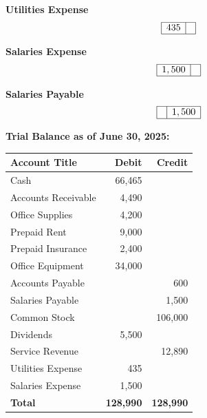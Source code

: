 \documentclass[12pt,a4paper]{book}
\begin{document}
\vspace{0.3cm}
\textbf{Utilities Expense}
\[
\begin{array}{|l|l|}
\hline
435 & \\
\hline
\end{array}
\]

\vspace{0.3cm}
\textbf{Salaries Expense}
\[
\begin{array}{|l|l|}
\hline
1,500 & \\
\hline
\end{array}
\]

\vspace{0.3cm}
\textbf{Salaries Payable}
\[
\begin{array}{|l|l|}
\hline
 & 1,500 \\
\hline
\end{array}
\]

\vspace{0.5cm}
\textbf{Trial Balance as of June 30, 2025:}

\begin{center}
\begin{tabular}{|l|r|r|}
\hline
\textbf{Account Title} & \textbf{Debit} & \textbf{Credit} \\
\hline
Cash & 66,465 & \\
Accounts Receivable & 4,490 & \\
Office Supplies & 4,200 & \\
Prepaid Rent & 9,000 & \\
Prepaid Insurance & 2,400 & \\
Office Equipment & 34,000 & \\
Accounts Payable & & 600 \\
Salaries Payable & & 1,500 \\
Common Stock & & 106,000 \\
Dividends & 5,500 & \\
Service Revenue & & 12,890 \\
Utilities Expense & 435 & \\
Salaries Expense & 1,500 & \\
\hline
\textbf{Total} & \textbf{128,990} & \textbf{128,990} \\
\hline
\end{tabular}
\end{center}

\clearpage




\vspace{1cm}
\clearpage

\end{document}
